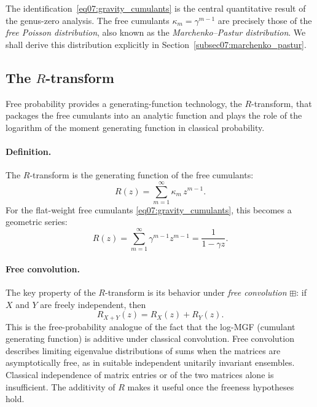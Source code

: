 \documentclass[11pt,letterpaper]{article}
\theoremstyle{plain}
\theoremstyle{definition}
\theoremstyle{remark}
\begin{document}
The identification~\eqref{eq07:gravity_cumulants} is the central
quantitative result of the genus-zero analysis.  The free cumulants
$\kappa_m = \gamma^{m-1}$ are precisely those of the \emph{free Poisson
distribution}, also known as the \emph{Marchenko--Pastur distribution}.
We shall derive this distribution explicitly in
Section~\ref{subsec07:marchenko_pastur}.


\subsection{The \texorpdfstring{$R$}{R}-transform}
\label{subsec07:r_transform}

Free probability provides a generating-function technology, the
$R$-transform, that packages the free cumulants into an analytic function
and plays the role of the logarithm of the moment generating function in
classical probability.

\paragraph{Definition.}
The $R$-transform is the generating function of the free cumulants:
\begin{equation}
  R(z) = \sum_{m=1}^{\infty} \kappa_m\, z^{m-1}.
  \label{eq07:r_transform_def}
\end{equation}
For the flat-weight free cumulants \eqref{eq07:gravity_cumulants}, this
becomes a geometric series:
\begin{equation}
  \boxed{
    R(z) = \sum_{m=1}^{\infty} \gamma^{m-1} z^{m-1}
         = \frac{1}{1 - \gamma z}.
  }
  \label{eq07:r_gravity}
\end{equation}

\paragraph{Free convolution.}
The key property of the $R$-transform is its behavior under
\emph{free convolution} $\boxplus$: if $X$ and $Y$ are freely independent,
then
\begin{equation}
  R_{X+Y}(z) = R_X(z) + R_Y(z).
  \label{eq07:free_convolution}
\end{equation}
This is the free-probability analogue of the fact that the log-MGF
(cumulant generating function) is additive under classical convolution.
Free convolution describes limiting eigenvalue distributions of sums when
the matrices are asymptotically free, as in suitable independent
unitarily invariant ensembles. Classical independence of matrix entries or
of the two matrices alone is insufficient. The additivity of $R$ makes
it useful once the freeness hypotheses hold.
\end{document}
